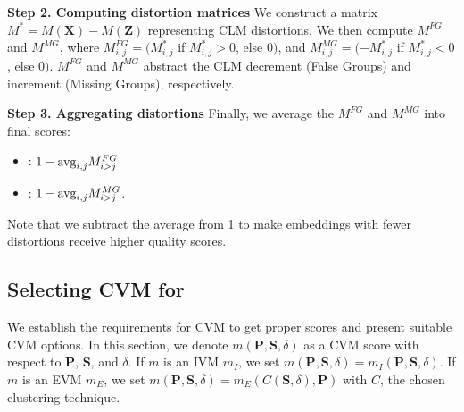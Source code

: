 \noindent
\textbf{Step 2. Computing distortion matrices}
We construct a matrix $M^{*} = M(\mathbf{X}) - M(\mathbf{Z})$ representing CLM distortions. We then compute $M^{FG}$ and $M^{MG}$, where $M^{FG}_{i,j} = (M^{*}_{i,j}$ if $M^{*}_{i,j} >0$, else $0)$, and $M^{MG}_{i,j} = (-M^{*}_{i,j}$ if $M^{*}_{i,j} <0$, else $0)$. 
$M^{FG}$ and $M^{MG}$ abstract the CLM decrement (False Groups) and increment (Missing Groups), respectively.


\noindent
\textbf{Step 3. Aggregating distortions}
Finally, we average the  $M^{FG}$ and $M^{MG}$ into final scores:

\begin{itemize}
    \item[] \hspace{7mm} \textsc{\LT}: $1 - \mbox{avg}_{i, j} {M^{FG}_{i > j}}$ \vspace{-2mm}
    \item[] \hspace{7mm} \textsc{\LC}: $1 - \mbox{avg}_{i, j} {M^{MG}_{i > j}}$.
\end{itemize}
Note that we subtract the average from 1 to make embeddings with fewer distortions receive higher quality scores.




\subsection{Selecting CVM for \lsc}

We establish the requirements for CVM to get proper \ltc scores and present suitable CVM options.
In this section, we denote $m(\mathbf{P}, \mathbf{S}, \delta)$ as a CVM score with respect to $\mathbf{P}$, $\mathbf{S}$, and $\delta$.
If $m$ is an IVM $m_I$, we set $m(\mathbf{P}, \mathbf{S}, \delta) = m_I(\mathbf{P}, \mathbf{S}, \delta)$. If $m$ is an EVM $m_E$, we set $m(\mathbf{P}, \mathbf{S}, \delta) = m_E(C(\mathbf{S}, \delta), \mathbf{P})$ with $C$, the chosen clustering technique.



